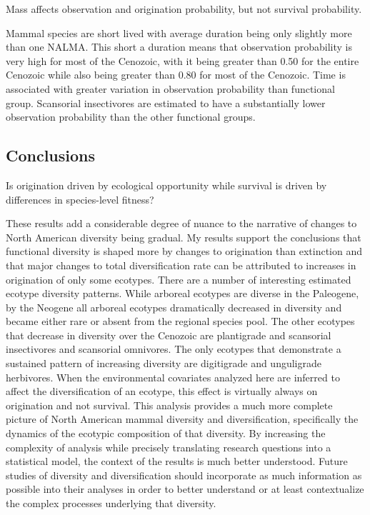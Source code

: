 \documentclass[12pt,letterpaper]{article}
\begin{document}
Mass affects observation and origination probability, but not survival probability.



Mammal species are short lived with average duration being only slightly more than one NALMA. This short a duration means that observation probability is very high for most of the Cenozoic, with it being greater than 0.50 for the entire Cenozoic while also being greater than 0.80 for most of the Cenozoic. Time is associated with greater variation in observation probability than functional group. Scansorial insectivores are estimated to have a substantially lower observation probability than the other functional groups.










\subsection*{Conclusions}

Is origination driven by ecological opportunity while survival is driven by differences in species-level fitness?

These results add a considerable degree of nuance to the narrative of changes to North American diversity being gradual. My results support the conclusions that functional diversity is shaped more by changes to origination than extinction and that major changes to total diversification rate can be attributed to increases in origination of only some ecotypes. There are a number of interesting estimated ecotype diversity patterns. While arboreal ecotypes are diverse in the Paleogene, by the Neogene all arboreal ecotypes dramatically decreased in diversity and became either rare or absent from the regional species pool. The other ecotypes that decrease in diversity over the Cenozoic are plantigrade and scansorial insectivores and scansorial omnivores. The only ecotypes that demonstrate a sustained pattern of increasing diversity are digitigrade and unguligrade herbivores. When the environmental covariates analyzed here are inferred to affect the diversification of an ecotype, this effect is virtually always on origination and not survival. This analysis provides a much more complete picture of North American mammal diversity and diversification, specifically the dynamics of the ecotypic composition of that diversity. By increasing the complexity of analysis while precisely translating research questions into a statistical model, the context of the results is much better understood. Future studies of diversity and diversification should incorporate as much information as possible into their analyses in order to better understand or at least contextualize the complex processes underlying that diversity.
\end{document}
